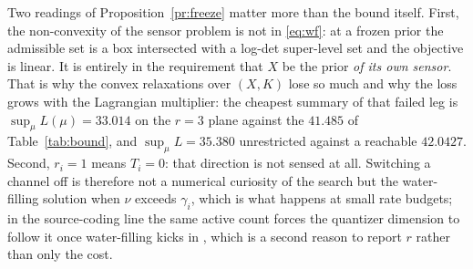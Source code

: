 \documentclass[journal]{IEEEtran}
\theoremstyle{remark}
\begin{document}
Two readings of Proposition~\ref{pr:freeze} matter more than the bound itself.
First, the non-convexity of the sensor problem is not in \eqref{eq:wf}: at a
frozen prior the admissible set is a box intersected with a log-det
super-level set and the objective is linear. It is entirely in the requirement
that $X$ be the prior \emph{of its own sensor}. That is why the convex
relaxations over $(X,K)$ lose so much and why the loss grows with the
Lagrangian multiplier: the cheapest summary of that failed leg is
$\sup_\mu L(\mu)=33.014$ on the $r=3$ plane against the $41.485$ of
Table~\ref{tab:bound}, and $\sup_\mu L=35.380$ unrestricted against a
reachable $42.0427$. 
Second, $r_i=1$ means $T_i=0$: that direction is not sensed at all. Switching a
channel off is therefore not a numerical curiosity of the search but the
water-filling solution when $\nu$ exceeds $\gamma_i$, which is what happens at
small rate budgets; in the source-coding line the same active count forces the
quantizer dimension to follow it once water-filling kicks in
\cite{stavrou2018zerodelay}, which is a second reason to report $r$ rather than
only the cost.
\end{document}
